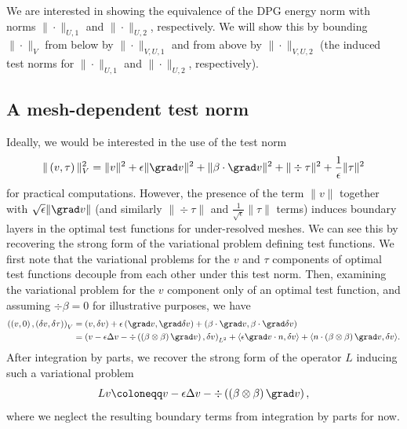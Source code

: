 We are interested in showing the equivalence of the DPG energy norm with norms $\|\cdot\|_{U,1}$ and $\|\cdot\|_{U,2}$, respectively.  We will show this by bounding $\|\cdot \|_V$ from below by $\|\cdot\|_{V,U,1}$ and from above by $\|\cdot\|_{V,U,2}$ (the induced test norms for $\|\cdot\|_{U,1}$ and $\|\cdot\|_{U,2}$, respectively).  


\subsection{A mesh-dependent test norm}
Ideally, we would be interested in the use of the test norm 
\[
\|\left(v,\tau\right)\|_{V}^2 = \|v\|^2 + \epsilon \|\grad v\|^2 + \|\beta \cdot \grad v\|^2 + \| \div \tau\|^2 + \frac{1}{\epsilon}\|\tau\|^2
\]
for practical computations. However, the presence of the term $\|v\|$ together with $\sqrt{\epsilon}\|\grad v\|$ (and similarly $\|\div \tau\|$ and $\frac{1}{\sqrt{\epsilon}}\|\tau\|$ terms) induces boundary layers in the optimal test functions for under-resolved meshes. We can see this by recovering the strong form of the variational problem defining test functions. We first note that the variational problems for the $v$ and $\tau$ components of optimal test functions decouple from each other under this test norm. Then, examining the variational problem for the $v$ component only of an optimal test function, and assuming $\div \beta = 0$ for illustrative purposes, we have 
\begin{align*}
\left(\left(v,0\right),\left(\delta v,\delta\tau\right)\right)_{V} &= (v,\delta v) + \epsilon \left(\grad v,\grad \delta v\right) + \left(\beta \cdot \grad v, \beta \cdot \grad \delta v\right)\\
&= \left(v - \epsilon \Delta v - \div \left(\left(\beta \otimes \beta\right) \grad v\right), \delta v\right)_{L^2} + \langle \epsilon \grad v\cdot n, \delta v\rangle + \langle n\cdot \left(\beta\otimes\beta\right) \grad v , \delta v\rangle.
\end{align*}
After integration by parts, we recover the strong form of the operator $L$ inducing such a variational problem 
\[
Lv \coloneqq v - \epsilon \Delta v - \div \left(\left(\beta \otimes \beta\right) \grad v\right),
\]
where we neglect the resulting boundary terms from integration by parts for now. 

